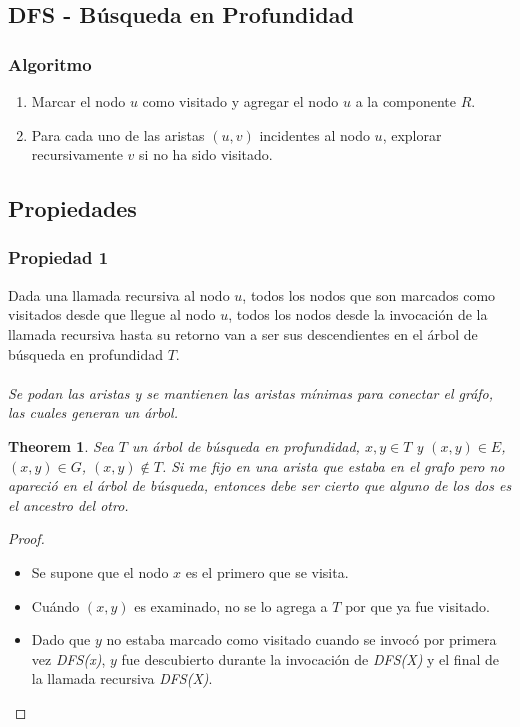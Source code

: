\documentclass[12pt, fleqn]{article}
\newtheorem{theorem}{Theorem}[section]
\theoremstyle{definition}
\begin{document}
        \subsection{DFS - Búsqueda en Profundidad}
            \subsubsection{Algoritmo}
                \begin{enumerate}
                    \item Marcar el nodo $u$ como visitado y agregar el nodo $u$ a la componente $R$.
                    \item Para cada uno de las aristas $(u,v)$ incidentes al nodo $u$, 
                        explorar recursivamente $v$ si no ha sido visitado.
                \end{enumerate}
            \subsection{Propiedades}
                \subsubsection{Propiedad 1}
                    Dada una llamada recursiva al nodo $u$, todos los nodos que son marcados como 
                    visitados desde que llegue al nodo $u$, todos los nodos desde la invocación de la 
                    llamada recursiva hasta su retorno van a ser sus descendientes en 
                    el árbol de búsqueda en profundidad $T$.\\\\
                    \emph{Se podan las aristas y se mantienen las aristas mínimas para conectar el gráfo,
                    las cuales generan un árbol.}
                    \begin{theorem}
                        Sea $T$ un árbol de búsqueda en profundidad, $x,y \in T$ y $(x,y) \in E$,
                        $(x,y) \in G$, $(x,y) \notin T$. Si me fijo en una arista que estaba en el grafo
                        pero no apareció en el árbol de búsqueda, entonces debe ser cierto que alguno
                        de los dos es el ancestro del otro.
                    \end{theorem}
                    \begin{proof}
                        \begin{itemize}
                            \item Se supone que el nodo $x$ es el primero que se visita.
                            \item Cuándo $(x,y)$ es examinado, no se lo agrega a $T$ por que ya fue 
                                visitado.
                            \item Dado que $y$ no estaba marcado como visitado cuando se invocó por primera
                                vez \emph{DFS(x)}, $y$ fue descubierto durante la invocación de \emph{DFS(X)}
                                y el final de la llamada recursiva \emph{DFS(X)}.
                        \end{itemize}
                    \end{proof}
\end{document}
